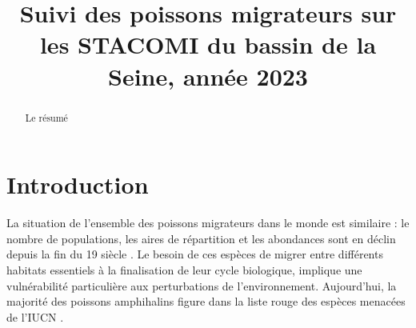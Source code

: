 \documentclass[11pt,titlepage,twoside]{report}\usepackage[]{graphicx}\usepackage[table]{xcolor}
\title{Suivi des poissons migrateurs sur les STACOMI du bassin de la Seine,
année 2023}
\begin{document}
\hypersetup{pageanchor=false}

\begin{titlepage}



\end{titlepage}



\newpage
\thispagestyle{empty}
\strut
\newpage

 \setcounter{page}{1} 

\begin{abstract}

Le résumé

\end{abstract}

\newpage

\tableofcontents

\clearpage

\listoffigures

\listoftables

\hypersetup{pageanchor=false}

\clearpage

 \setcounter{page}{1} 



\section{Introduction}

La situation de l'ensemble des poissons migrateurs dans le monde
est similaire : le nombre de populations,
les aires de répartition et les abondances sont en déclin depuis la fin du 19 siècle
\citep{saunders_atlantic_1981,bagliniere_reintroductions_1990,parrish_why_2011,jonsson_extinction_1999,
keith_atlas_2001,rochard_identification_2007,limburg_dramatic_2009}.
Le besoin de ces espèces de migrer entre différents habitats essentiels à la finalisation
de leur cycle biologique, implique une vulnérabilité particulière aux perturbations de l'environnement.
Aujourd'hui, la majorité des poissons amphihalins figure dans la liste rouge
des espèces menacées de l'IUCN \citep{limburg_dramatic_2009}.
\end{document}
